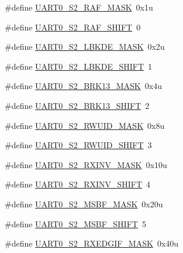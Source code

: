 \begin{DoxyCompactItemize}
\#define \hyperlink{group___u_a_r_t0___register___masks_gad94f9eb4b442dddbafa335f05b46fb12}{U\+A\+R\+T0\+\_\+\+S2\+\_\+\+R\+A\+F\+\_\+\+M\+A\+SK}~0x1u
\item 
\#define \hyperlink{group___u_a_r_t0___register___masks_ga8e9f146d124df7852ee019088189a84a}{U\+A\+R\+T0\+\_\+\+S2\+\_\+\+R\+A\+F\+\_\+\+S\+H\+I\+FT}~0
\item 
\#define \hyperlink{group___u_a_r_t0___register___masks_ga3347bd085733dc5c1d7ed86259528d60}{U\+A\+R\+T0\+\_\+\+S2\+\_\+\+L\+B\+K\+D\+E\+\_\+\+M\+A\+SK}~0x2u
\item 
\#define \hyperlink{group___u_a_r_t0___register___masks_ga79be5f31bb69a54c78a60ae8859caa90}{U\+A\+R\+T0\+\_\+\+S2\+\_\+\+L\+B\+K\+D\+E\+\_\+\+S\+H\+I\+FT}~1
\item 
\#define \hyperlink{group___u_a_r_t0___register___masks_gaeda16004cc22274e11f447311ec15362}{U\+A\+R\+T0\+\_\+\+S2\+\_\+\+B\+R\+K13\+\_\+\+M\+A\+SK}~0x4u
\item 
\#define \hyperlink{group___u_a_r_t0___register___masks_ga655fdc462508918f7874cb9078e0336b}{U\+A\+R\+T0\+\_\+\+S2\+\_\+\+B\+R\+K13\+\_\+\+S\+H\+I\+FT}~2
\item 
\#define \hyperlink{group___u_a_r_t0___register___masks_ga56d14f088c8bf415092b13fc8a7ff8eb}{U\+A\+R\+T0\+\_\+\+S2\+\_\+\+R\+W\+U\+I\+D\+\_\+\+M\+A\+SK}~0x8u
\item 
\#define \hyperlink{group___u_a_r_t0___register___masks_ga087e7d36d10ab05400ef6a3acbe6f83a}{U\+A\+R\+T0\+\_\+\+S2\+\_\+\+R\+W\+U\+I\+D\+\_\+\+S\+H\+I\+FT}~3
\item 
\#define \hyperlink{group___u_a_r_t0___register___masks_ga81c81000cf5906711578a36178776ae9}{U\+A\+R\+T0\+\_\+\+S2\+\_\+\+R\+X\+I\+N\+V\+\_\+\+M\+A\+SK}~0x10u
\item 
\#define \hyperlink{group___u_a_r_t0___register___masks_ga7c2ed6447fb3c4daa5ed8fd4b29cffca}{U\+A\+R\+T0\+\_\+\+S2\+\_\+\+R\+X\+I\+N\+V\+\_\+\+S\+H\+I\+FT}~4
\item 
\#define \hyperlink{group___u_a_r_t0___register___masks_ga3d18e7a9445af9999a425598ae57dd1a}{U\+A\+R\+T0\+\_\+\+S2\+\_\+\+M\+S\+B\+F\+\_\+\+M\+A\+SK}~0x20u
\item 
\#define \hyperlink{group___u_a_r_t0___register___masks_gae193269e5cdcca203195efc7bd5a7e13}{U\+A\+R\+T0\+\_\+\+S2\+\_\+\+M\+S\+B\+F\+\_\+\+S\+H\+I\+FT}~5
\item 
\#define \hyperlink{group___u_a_r_t0___register___masks_gaa8912e7668721bb52173cf2d57d9a2df}{U\+A\+R\+T0\+\_\+\+S2\+\_\+\+R\+X\+E\+D\+G\+I\+F\+\_\+\+M\+A\+SK}~0x40u
\item 

\end{DoxyCompactItemize}
